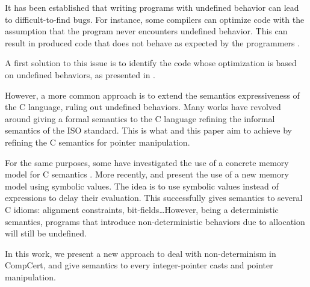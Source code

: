 It has been established that writing programs with undefined behavior can lead to difficult-to-find bugs.
For instance, some compilers can optimize code with the assumption that the program never encounters undefined behavior. This can result in produced code that does not behave as expected by the programmers \cite{DBLP:conf/apsys/WangCCJZK12}.

A first solution to this issue is to identify the code whose optimization is based on undefined behaviors, as presented in \cite{DBLP:conf/sosp/WangZKS13}.

However, a more common approach is to extend the semantics expressiveness of the C language, ruling out undefined behaviors.
Many works have revolved around giving a formal semantics to the C language refining the informal semantics of the ISO standard.
This is what \cite{DBLP:conf/pldi/KangHMGZV15} and this paper aim to achieve by refining the C semantics for pointer manipulation.

For the same purposes, some have investigated the use of a concrete memory model for C semantics \cite{DBLP:conf/popl/TuchKN07}\cite{Norrish98cformalised}.
More recently, \cite{besson:hal-01093312} and \cite{DBLP:conf/itp/BessonBW15} present the use of a new memory model using symbolic values. The idea is to use symbolic values instead of expressions to delay their evaluation. This successfully gives semantics to several C idioms: alignment constraints, bit-fields\dots However, being a deterministic semantics, programs that introduce non-deterministic behaviors due to allocation will still be undefined.

In this work, we present a new approach to deal with non-determinism in CompCert, and give semantics to every integer-pointer casts and pointer manipulation.
